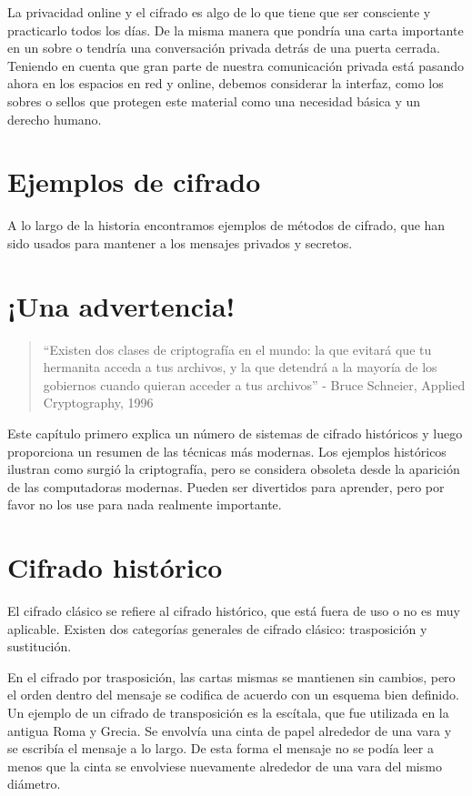 \documentclass[10pt,a5paper,twoside,,]{book}
\begin{document}
La privacidad online y el cifrado es algo de lo que tiene que ser
consciente y practicarlo todos los días. De la misma manera que pondría
una carta importante en un sobre o tendría una conversación privada
detrás de una puerta cerrada. Teniendo en cuenta que gran parte de
nuestra comunicación privada está pasando ahora en los espacios en red y
online, debemos considerar la interfaz, como los sobres o sellos que
protegen este material como una necesidad básica y un derecho humano.

\section{Ejemplos de cifrado}\label{ejemplos-de-cifrado}

A lo largo de la historia encontramos ejemplos de métodos de cifrado,
que han sido usados para mantener a los mensajes privados y secretos.

\section{¡Una advertencia!}\label{una-advertencia}

\begin{quote}
``Existen dos clases de criptografía en el mundo: la que evitará que tu
hermanita acceda a tus archivos, y la que detendrá a la mayoría de los
gobiernos cuando quieran acceder a tus archivos'' - Bruce Schneier,
Applied Cryptography, 1996
\end{quote}

Este capítulo primero explica un número de sistemas de cifrado
históricos y luego proporciona un resumen de las técnicas más modernas.
Los ejemplos históricos ilustran como surgió la criptografía, pero se
considera obsoleta desde la aparición de las computadoras modernas.
Pueden ser divertidos para aprender, pero por favor no los use para nada
realmente importante.

\section{Cifrado histórico}\label{cifrado-histuxf3rico}

El cifrado clásico se refiere al cifrado histórico, que está fuera de
uso o no es muy aplicable. Existen dos categorías generales de cifrado
clásico: trasposición y sustitución.

En el cifrado por trasposición, las cartas mismas se mantienen sin
cambios, pero el orden dentro del mensaje se codifica de acuerdo con un
esquema bien definido. Un ejemplo de un cifrado de transposición es la
escítala, que fue utilizada en la antigua Roma y Grecia. Se envolvía una
cinta de papel alrededor de una vara y se escribía el mensaje a lo
largo. De esta forma el mensaje no se podía leer a menos que la cinta se
envolviese nuevamente alrededor de una vara del mismo diámetro.
\end{document}
